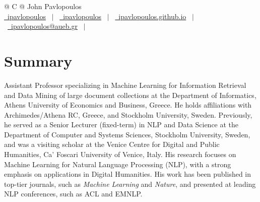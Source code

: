 \documentclass[a4paper,12pt]{article}
\begin{document}
\pagestyle{empty} 



\begin{tabularx}{\linewidth}{@{} C @{}}
\Huge{John Pavlopoulos} \\[7.5pt]
\href{https://github.com/ipavlopoulos}{\raisebox{-0.05\height}\faGithub\ ipavlopoulos} \ $|$ \ 
\href{https://linkedin.com/in/itpavlopoulos}{\raisebox{-0.05\height}\faLinkedin\ ipavlopoulos} \ $|$ \ 
\href{https://ipavlopoulos.github.io/}{\raisebox{-0.05\height}\faGlobe \ ipavlopoulos.github.io} \ $|$ \ 
\href{mailto:ipavlopoulos@aueb.gr}{\raisebox{-0.05\height}\faEnvelope \ ipavlopoulos@aueb.gr} \ $|$ \ 
\end{tabularx}


\section{Summary}
Assistant Professor specializing in Machine Learning for Information Retrieval and Data Mining of large document collections at the Department of Informatics, Athens University of Economics and Business, Greece. He holds affiliations with Archimedes/Athena RC, Greece, and Stockholm University, Sweden. Previously, he served as a Senior Lecturer (fixed-term) in NLP and Data Science at the Department of Computer and Systems Sciences, Stockholm University, Sweden, and was a visiting scholar at the Venice Centre for Digital and Public Humanities, Ca’ Foscari University of Venice, Italy. His research focuses on Machine Learning for Natural Language Processing (NLP), with a strong emphasis on applications in Digital Humanities. His work has been published in top-tier journals, such as \emph{Machine Learning} and \emph{Nature}, and presented at leading NLP conferences, such as ACL and EMNLP. 
\end{document}
